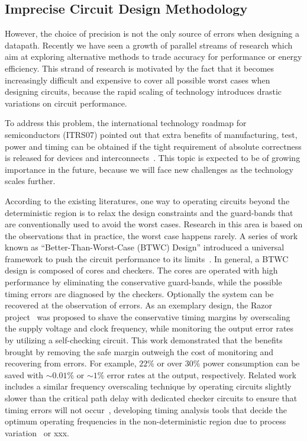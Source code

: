 \documentclass[journal]{IEEEtran}
\begin{document}
\subsection{Imprecise Circuit Design Methodology}\label{Section_Background_Imprecise}
However, the choice of precision is not the only source of errors when designing a datapath. Recently we have seen a growth of parallel streams of research which aim at exploring alternative methods to trade accuracy for performance or energy efficiency. This strand of research is motivated by the fact that it becomes increasingly difficult and expensive to cover all possible worst cases when designing circuits, because the rapid scaling of technology introduces drastic variations on circuit performance.

To address this problem, the international technology roadmap for semiconductors (ITRS07) pointed out that extra benefits of manufacturing, test, power and timing can be obtained if the tight requirement of absolute correctness is released for devices and interconnects~\cite{semiconductor2007international}. This topic is expected to be of growing importance in the future, because we will face new challenges as the technology scales further.

According to the existing literatures, one way to operating circuits beyond the deterministic region is to relax the design constraints and the guard-bands that are conventionally used to avoid the worst cases. Research in this area is based on the observations that in practice, the worst case happens rarely. A series of work known as ``Better-Than-Worst-Case (BTWC) Design'' introduced a universal framework to push the circuit performance to its limits~\cite{BetterThanWS2005}. In general, a BTWC design is composed of cores and checkers. The cores are operated with high performance by eliminating the conservative guard-bands, while the possible timing errors are diagnosed by the checkers. Optionally the system can be recovered at the observation of errors. As an exemplary design, the Razor project~\cite{Razor2003,Razor2004} was proposed to shave the conservative timing margins by overscaling the supply voltage and clock frequency, while monitoring the output error rates by utilizing a self-checking circuit. This work demonstrated that the benefits brought by removing the safe margin outweigh the cost of monitoring and recovering from errors. For example, $22\%$ or over $30\%$ power consumption can be saved with $\sim0.01\%$ or $\sim1\%$ error rates at the output, respectively. Related work includes a similar frequency overscaling technique by operating circuits slightly slower than the critical path delay with dedicated checker circuits to ensure that timing errors will not occur~\cite{TEAtime2004}, developing timing analysis tools that decide the optimum operating frequencies in the non-deterministic region due to process variation~\cite{ProbabilisticSTA} or xxx.
\end{document}

